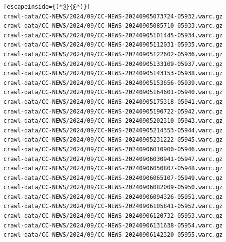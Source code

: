 \begin{lstlisting}[escapeinside={(*@}{@*)}]
crawl-data/CC-NEWS/2024/09/CC-NEWS-20240905073724-05932.warc.gz
crawl-data/CC-NEWS/2024/09/CC-NEWS-20240905085710-05933.warc.gz
crawl-data/CC-NEWS/2024/09/CC-NEWS-20240905101445-05934.warc.gz
crawl-data/CC-NEWS/2024/09/CC-NEWS-20240905112031-05935.warc.gz
crawl-data/CC-NEWS/2024/09/CC-NEWS-20240905122602-05936.warc.gz
crawl-data/CC-NEWS/2024/09/CC-NEWS-20240905133109-05937.warc.gz
crawl-data/CC-NEWS/2024/09/CC-NEWS-20240905143153-05938.warc.gz
crawl-data/CC-NEWS/2024/09/CC-NEWS-20240905153656-05939.warc.gz
crawl-data/CC-NEWS/2024/09/CC-NEWS-20240905164601-05940.warc.gz
crawl-data/CC-NEWS/2024/09/CC-NEWS-20240905175318-05941.warc.gz
crawl-data/CC-NEWS/2024/09/CC-NEWS-20240905190722-05942.warc.gz
crawl-data/CC-NEWS/2024/09/CC-NEWS-20240905202310-05943.warc.gz
crawl-data/CC-NEWS/2024/09/CC-NEWS-20240905214353-05944.warc.gz
crawl-data/CC-NEWS/2024/09/CC-NEWS-20240905231222-05945.warc.gz
crawl-data/CC-NEWS/2024/09/CC-NEWS-20240906010900-05946.warc.gz
crawl-data/CC-NEWS/2024/09/CC-NEWS-20240906030941-05947.warc.gz
crawl-data/CC-NEWS/2024/09/CC-NEWS-20240906050807-05948.warc.gz
crawl-data/CC-NEWS/2024/09/CC-NEWS-20240906065107-05949.warc.gz
crawl-data/CC-NEWS/2024/09/CC-NEWS-20240906082009-05950.warc.gz
crawl-data/CC-NEWS/2024/09/CC-NEWS-20240906094326-05951.warc.gz
crawl-data/CC-NEWS/2024/09/CC-NEWS-20240906105841-05952.warc.gz
crawl-data/CC-NEWS/2024/09/CC-NEWS-20240906120732-05953.warc.gz
crawl-data/CC-NEWS/2024/09/CC-NEWS-20240906131638-05954.warc.gz
crawl-data/CC-NEWS/2024/09/CC-NEWS-20240906142320-05955.warc.gz
\end{lstlisting}

